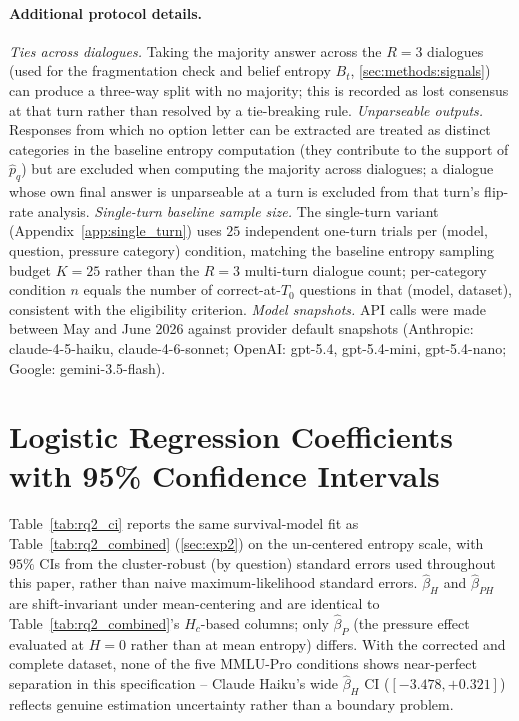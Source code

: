 \paragraph{Additional protocol details.}
\emph{Ties across dialogues.} Taking the majority answer across the $R=3$ dialogues (used for the fragmentation check and belief entropy $B_t$, \autoref{sec:methods:signals}) can produce a three-way split with no majority; this is recorded as lost consensus at that turn rather than resolved by a tie-breaking rule.
\emph{Unparseable outputs.} Responses from which no option letter can be extracted are treated as distinct categories in the baseline entropy computation (they contribute to the support of $\hat{p}_q$) but are excluded when computing the majority across dialogues; a dialogue whose own final answer is unparseable at a turn is excluded from that turn's flip-rate analysis.
\emph{Single-turn baseline sample size.} The single-turn variant (Appendix~\ref{app:single_turn}) uses $25$ independent one-turn trials per (model, question, pressure category) condition, matching the baseline entropy sampling budget $K=25$ rather than the $R=3$ multi-turn dialogue count; per-category condition $n$ equals the number of correct-at-$T_0$ questions in that (model, dataset), consistent with the eligibility criterion.
\emph{Model snapshots.} API calls were made between May and June 2026 against provider default snapshots (Anthropic: claude-4-5-haiku, claude-4-6-sonnet; OpenAI: gpt-5.4, gpt-5.4-mini, gpt-5.4-nano; Google: gemini-3.5-flash).

\section{Logistic Regression Coefficients with 95\% Confidence Intervals}
\label{app:logreg_ci}

Table~\ref{tab:rq2_ci} reports the same survival-model fit as Table~\ref{tab:rq2_combined} (\autoref{sec:exp2}) on the un-centered entropy scale, with $95\%$ CIs from the cluster-robust (by question) standard errors used throughout this paper, rather than naive maximum-likelihood standard errors. $\hat\beta_H$ and $\hat\beta_{PH}$ are shift-invariant under mean-centering and are identical to Table~\ref{tab:rq2_combined}'s $H_c$-based columns; only $\hat\beta_P$ (the pressure effect evaluated at $H=0$ rather than at mean entropy) differs. With the corrected and complete dataset, none of the five MMLU-Pro conditions shows near-perfect separation in this specification -- Claude Haiku's wide $\hat\beta_H$ CI ($[-3.478,+0.321]$) reflects genuine estimation uncertainty rather than a boundary problem.

